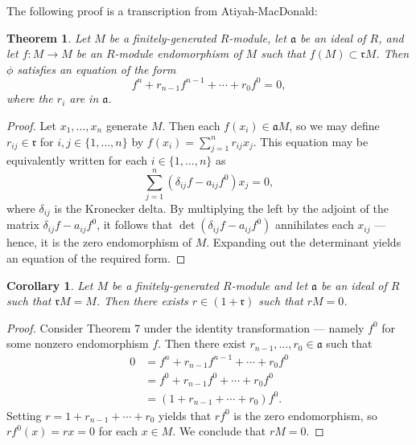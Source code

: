 \documentclass[11pt]{article}
\newtheorem{theorem}{Theorem}
\newtheorem{corollary}{Corollary}
\begin{document}
The following proof is a transcription from Atiyah-MacDonald:

\begin{adjustwidth}{1cm}{}
	\begin{theorem}
		Let $M$ be a finitely-generated $R$-module, let $\mathfrak{a}$ be an ideal of $R$, and let $f : M \to M$ be an $R$-module endomorphism of $M$ such that $f(M) \subset \mathfrak{r}M$. Then $\phi$ satisfies an equation of the form
		\[
			f^{n} + r_{n - 1} f^{n - 1} + \cdots + r_{0} f^{0} = 0,
		\]
		where the $r_{i}$ are in $\mathfrak{a}$.
	\end{theorem}
	\begin{proof}
		Let $x_{1}, \ldots, x_{n}$ generate $M$. Then each $f(x_{i}) \in \mathfrak{a} M$, so we may define $r_{ij} \in \mathfrak{r}$ for $i, j \in \{ 1, \ldots, n \}$ by $f(x_{i}) = \sum_{j = 1}^{n} r_{ij}x_{j}$. This equation may be equivalently written for each $i \in \{ 1, \ldots, n \}$ as
		\[
			\sum\limits_{j = 1}^{n} (\delta_{ij} f - a_{ij} f^{0}) x_{j} = 0,
		\]
		where $\delta_{ij}$ is the Kronecker delta. By multiplying the left by the adjoint of the matrix $\delta_{ij} f - a_{ij} f^{0}$, it follows that $\det(\delta_{ij} f - a_{ij} f^{0})$ annihilates each $x_{ij}$ --- hence, it is the zero endomorphism of $M$. Expanding out the determinant yields an equation of the required form.
	\end{proof}
\end{adjustwidth}

\begin{adjustwidth}{1cm}{}
	\begin{corollary}
		Let $M$ be a finitely-generated $R$-module and let $\mathfrak{a}$ be an ideal of $R$ such that $\mathfrak{r} M = M$. Then there exists $r \in (1 + \mathfrak{r})$ such that $rM = 0$.
	\end{corollary}
	\begin{proof}
		Consider Theorem 7 under the identity transformation --- namely $f^{0}$ for some nonzero endomorphism $f$. Then there exist $r_{n - 1}, \ldots, r_{0} \in \mathfrak{a}$ such that
		\begin{align*}
			0 &= f^{n} + r_{n - 1} f^{n - 1} + \cdots + r_{0} f^{0} \\
			&= f^{0} + r_{n - 1} f^{0} + \cdots + r_{0} f^{0} \\
			&= (1 + r_{n - 1} + \cdots + r_{0}) f^{0}.
		\end{align*}
		Setting $r = 1 + r_{n - 1} + \cdots + r_{0}$ yields that $r f^{0}$ is the zero endomorphism, so $r f^{0}(x) = rx = 0$ for each $x \in M$. We conclude that $rM = 0$.
	\end{proof}
\end{adjustwidth}
\end{document}
